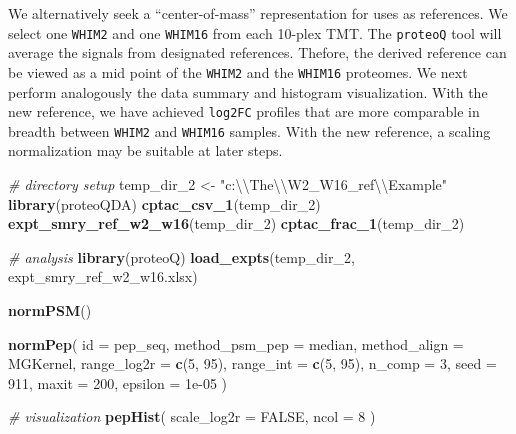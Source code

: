 \documentclass[]{article}
\newenvironment{Shaded}{\begin{snugshade}}{\end{snugshade}}
\newcommand{\CharTok}[1]{\textcolor[rgb]{0.31,0.60,0.02}{#1}}
\newcommand{\CommentTok}[1]{\textcolor[rgb]{0.56,0.35,0.01}{\textit{#1}}}
\newcommand{\DataTypeTok}[1]{\textcolor[rgb]{0.13,0.29,0.53}{#1}}
\newcommand{\DecValTok}[1]{\textcolor[rgb]{0.00,0.00,0.81}{#1}}
\newcommand{\FloatTok}[1]{\textcolor[rgb]{0.00,0.00,0.81}{#1}}
\newcommand{\KeywordTok}[1]{\textcolor[rgb]{0.13,0.29,0.53}{\textbf{#1}}}
\newcommand{\NormalTok}[1]{#1}
\newcommand{\OtherTok}[1]{\textcolor[rgb]{0.56,0.35,0.01}{#1}}
\newcommand{\StringTok}[1]{\textcolor[rgb]{0.31,0.60,0.02}{#1}}
\begin{document}
We alternatively seek a ``center-of-mass'' representation for uses as
references. We select one \texttt{WHIM2} and one \texttt{WHIM16} from
each 10-plex TMT. The \texttt{proteoQ} tool will average the signals
from designated references. Thefore, the derived reference can be viewed
as a mid point of the \texttt{WHIM2} and the \texttt{WHIM16} proteomes.
We next perform analogously the data summary and histogram
visualization. With the new reference, we have achieved \texttt{log2FC}
profiles that are more comparable in breadth between \texttt{WHIM2} and
\texttt{WHIM16} samples. With the new reference, a scaling normalization
may be suitable at later steps.

\begin{Shaded}
\begin{Highlighting}[]
\CommentTok{# directory setup}
\NormalTok{temp_dir_}\DecValTok{2}\NormalTok{ <-}\StringTok{ "c:}\CharTok{\textbackslash{}\textbackslash{}}\StringTok{The}\CharTok{\textbackslash{}\textbackslash{}}\StringTok{W2_W16_ref}\CharTok{\textbackslash{}\textbackslash{}}\StringTok{Example"}
\KeywordTok{library}\NormalTok{(proteoQDA)}
\KeywordTok{cptac_csv_1}\NormalTok{(temp_dir_}\DecValTok{2}\NormalTok{)}
\KeywordTok{expt_smry_ref_w2_w16}\NormalTok{(temp_dir_}\DecValTok{2}\NormalTok{)}
\KeywordTok{cptac_frac_1}\NormalTok{(temp_dir_}\DecValTok{2}\NormalTok{)}

\CommentTok{# analysis}
\KeywordTok{library}\NormalTok{(proteoQ)}
\KeywordTok{load_expts}\NormalTok{(temp_dir_}\DecValTok{2}\NormalTok{, expt_smry_ref_w2_w16.xlsx)}

\KeywordTok{normPSM}\NormalTok{()}

\KeywordTok{normPep}\NormalTok{(}
  \DataTypeTok{id =}\NormalTok{ pep_seq, }
  \DataTypeTok{method_psm_pep =}\NormalTok{ median, }
  \DataTypeTok{method_align =}\NormalTok{ MGKernel, }
  \DataTypeTok{range_log2r =} \KeywordTok{c}\NormalTok{(}\DecValTok{5}\NormalTok{, }\DecValTok{95}\NormalTok{), }
  \DataTypeTok{range_int =} \KeywordTok{c}\NormalTok{(}\DecValTok{5}\NormalTok{, }\DecValTok{95}\NormalTok{), }
  \DataTypeTok{n_comp =} \DecValTok{3}\NormalTok{, }
  \DataTypeTok{seed =} \DecValTok{911}\NormalTok{, }
  \DataTypeTok{maxit =} \DecValTok{200}\NormalTok{, }
  \DataTypeTok{epsilon =} \FloatTok{1e-05}
\NormalTok{)}

\CommentTok{# visualization}
\KeywordTok{pepHist}\NormalTok{(}
    \DataTypeTok{scale_log2r =} \OtherTok{FALSE}\NormalTok{, }
    \DataTypeTok{ncol =} \DecValTok{8}
\NormalTok{)}
\end{Highlighting}
\end{Shaded}
\end{document}
